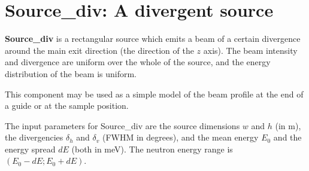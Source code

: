\section{Source\_div: A divergent source}

{\bf Source\_div} is a rectangular source which emits a
beam of a certain divergence around the main exit direction
(the direction of the $z$ axis).
The beam intensity and divergence are uniform over
the whole of the source, and the energy distribution
of the beam is uniform.

This component may be used as a simple model of the
beam profile at the end of a guide or at the sample
position.

The input parameters for Source\_div are the source dimensions
$w$ and $h$ (in m), the divergencies $\delta_h$ and $\delta_v$ (FWHM in degrees), 
and the mean energy $E_0$ and the energy spread $dE$ (both in meV).
The neutron energy range is $(E_0-dE; E_0+dE)$. 

